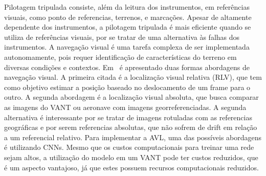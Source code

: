 Pilotagem tripulada consiste, além da leitura dos instrumentos, em referências visuais, como ponto de referencias, terrenos, e marcações. Apesar de altamente dependente dos instrumentos, a pilotagem tripulada é mais eficiente quando se utiliza de referências visuais, por se tratar de uma alternativa às falhas dos instrumentos. A navegação visual é uma tarefa complexa de ser implementada autonomamente, pois requer identificação de características do terreno em diversas condições e contextos. Em~\cite{COUTURIER2021103666} é apresentado duas formas abordagens de navegação visual. A primeira citada é a localização visual relativa (RLV), que tem como objetivo estimar a posição baseado no deslocamento de um frame para o outro. A segunda abordagem é a localização visual absoluta, que busca comparar as imagens do VANT ou aeronave com imagens georreferenciadas. A segunda alternativa é interessante por se tratar de imagens rotuladas com as referencias geográficas e por serem referencias absolutas, que não sofrem de drift em relação a um referencial relativo. Para implementar a AVL, uma das possíveis abordagens é utilizando CNNs. Mesmo que os custos computacionais para treinar uma rede sejam altos, a utilização do modelo em um VANT pode ter custos reduzidos, que é um aspecto vantajoso, já que estes possuem recursos computacionais reduzidos.